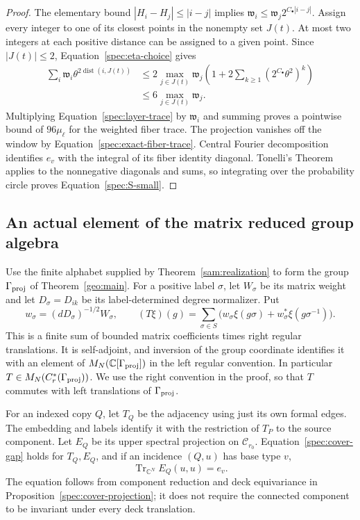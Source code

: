 \begin{proof}
The elementary bound $|H_i-H_j|\leq|i-j|$ implies
$\mathfrak w_i\leq\mathfrak w_j2^{C_\bullet|i-j|}$.
Assign every integer to one of its closest points in the nonempty set
$J(t)$.  At most two integers at each positive distance can be assigned
to a given point.  Since $|J(t)|\leq2$, Equation~\eqref{spec:eta-choice}
gives
\begin{align*}
 \sum_i\mathfrak w_i\theta^{2\operatorname{dist}(i,J(t))}
 &\leq2\max_{j\in J(t)}\mathfrak w_j
          \left(1+2\sum_{k\geq1}
                       (2^{C_\bullet}\theta^2)^k\right)\\
 &\leq6\max_{j\in J(t)}\mathfrak w_j.
\end{align*}
Multiplying Equation~\eqref{spec:layer-trace} by $\mathfrak w_i$ and
summing proves a pointwise bound of $96\mu_\ell$ for the weighted fiber
trace.  The projection vanishes off the window by
Equation~\eqref{spec:exact-fiber-trace}.  Central Fourier decomposition
identifies $e_v$ with the integral of its fiber identity diagonal.
Tonelli's Theorem applies to the nonnegative diagonals and sums, so
integrating over the probability circle proves
Equation~\eqref{spec:S-small}.
\end{proof}

\subsection{An actual element of the matrix reduced group algebra}

Use the finite alphabet supplied by Theorem~\ref{sam:realization} to form
the group $\Gamma_{\mathrm{proj}}$ of Theorem~\ref{geo:main}.  For a positive label
$\sigma$, let $W_\sigma$ be its matrix weight and let $D_\sigma=D_{ik}$
be its label-determined degree normalizer.  Put
\begin{equation}
 w_\sigma=(dD_\sigma)^{-1/2}W_\sigma,\qquad
 (T\xi)(g)=\sum_{\sigma\in S}
       \big(w_\sigma\xi(g\sigma)+w_\sigma^*\xi(g\sigma^{-1})\big).
 \label{spec:Cayley-operator}
\end{equation}
This is a finite sum of bounded matrix coefficients times right regular
translations.  It is self-adjoint, and inversion of the group coordinate
identifies it with an element of $M_N(\mathbb C[\Gamma_{\mathrm{proj}}])$ in the left
regular convention.  In particular
$T\in M_N(C_r^*(\Gamma_{\mathrm{proj}}))$.  We use the right convention in the proof,
so that $T$ commutes with left translations of $\Gamma_{\mathrm{proj}}$.

For an indexed copy $Q$, let $T_Q$ be the adjacency using just its own
formal edges.  The embedding and labels identify it with the restriction
of $T_P$ to the source component.  Let $E_Q$ be its upper spectral
projection on $\mathcal C_{r_0}$.  Equation~\eqref{spec:cover-gap}
holds for $T_Q,E_Q$, and if an incidence $(Q,u)$ has base type $v$,
\begin{equation}
           \operatorname{Tr}_{\mathbb C^N}E_Q(u,u)=e_v.
 \label{spec:copy-diagonal}
\end{equation}
The equation follows from component reduction and deck equivariance in
Proposition~\ref{spec:cover-projection}; it does not require the connected
component to be invariant under every deck translation.

